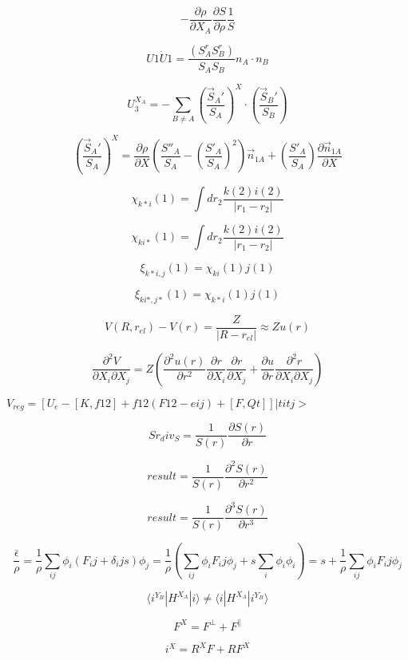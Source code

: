 \documentclass{article}
\begin{document}
\[
 -\frac{\partial \rho}{\partial X_A}\frac{\partial S}{\partial \rho}\frac{1}{S}
\]
\pagebreak

\[
 U1\dot U1 = \frac{\left(S^r_A S^r_B\right)}{S_A S_B} n_A \cdot n_B
\]
\pagebreak

\[
U_3^{X_A} = -\sum_{B\neq A}\left(\frac{\vec S_A'}{S_A}\right)^X\cdot\left(\frac{\vec S_B'}{S_B}\right)
\]
\pagebreak

\[
\left(\frac{\vec S_A'}{S_A}\right)^X =
    \frac{\partial \rho}{\partial X}\left(\frac{S''_A}{S_A}
         -\left(\frac{S'_A}{S_A}\right)^2\right)\vec n_{1A}
    + \left(\frac{S'_A}{S_A}\right)\frac{\partial \vec n_{1A}}{\partial X}
\]
\pagebreak

\[ \chi_{k{*} i}(1) = \int dr_2 \frac{k(2) i(2)}{|r_1-r_2|} \]
\pagebreak

\[ \chi_{ki{*}}(1) = \int dr_2 \frac{k(2) i(2)}{|r_1-r_2|} \]
\pagebreak

\[ \xi_{k{*}i,j}(1) = \chi_{ki}(1) j(1) \]
\pagebreak

\[ \xi_{ki{*},j{*}}(1) = \chi_{k{*}i}(1) j(1) \]
\pagebreak

\[
V(R,r_{el}) -V(r) =\frac{Z}{|R-r_{el}|} \approx Z u(r) \]
\pagebreak

\[
\frac{\partial^2 V}{\partial X_i\partial X_j}
  =  Z \left(\frac{\partial^2 u(r)}{\partial r^2} \frac{\partial r}{\partial X_i}
     \frac{\partial r}{\partial X_j} + \frac{\partial u}{\partial r}
     \frac{\partial^2 r}{\partial X_i \partial X_j}\right)
\]
\pagebreak

$ V_{reg} = [ U_e - [K,f12] + f12(F12-eij) + [F,Qt] ]|titj> $
\pagebreak

\[
    Sr_div_S = \frac{1}{S(r)}\frac{\partial S(r)}{\partial r}
\]
\pagebreak

\[
    result = \frac{1}{S(r)}\frac{\partial^2 S(r)}{\partial r^2}
\]
\pagebreak

\[
   result = \frac{1}{S(r)}\frac{\partial^3 S(r)}{\partial r^3}
\]
\pagebreak

\[
\frac{\bar \epsilon}{\rho} = \frac{1}{\rho}\sum_{ij}\phi_i(F_ij+\delta_ij s)\phi_j
       = \frac{1}{\rho} ( \sum_{ij}\phi_i F_ij \phi_j + s\sum_i\phi_i\phi_i )
       = s + \frac{1}{\rho} \sum_{ij}\phi_i F_ij \phi_j
\]
\pagebreak

\[
 \langle i^{Y_B}|H^{X_A}|i\rangle \neq \langle i|H^{X_A}|i^{Y_B}\rangle
\]
\pagebreak

\[
    F^X = F^\perp + F^\parallel
\]
\pagebreak

\[
  i^X   = R^X F + R F^X
\]
\pagebreak
\end{document}
